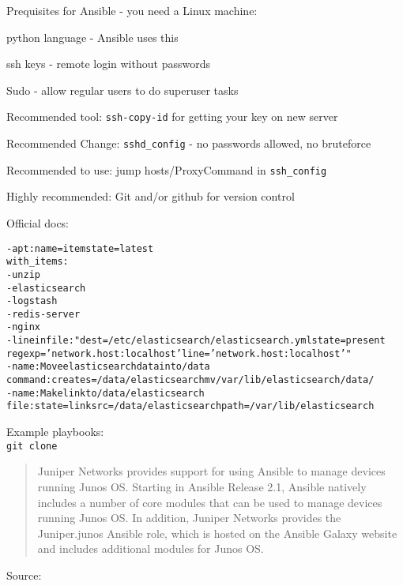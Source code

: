 \documentclass[Screen16to9,17pt]{foils}
\begin{document}
Prequisites for Ansible - you need a Linux machine:
\begin{list2}
\item python language - Ansible uses this
\item ssh keys - remote login without passwords
\item Sudo - allow regular users to do superuser tasks
\item Recommended tool: \verb+ssh-copy-id+ for getting your key on new server
\item Recommended Change: \verb+sshd_config+ - no passwords allowed, no bruteforce
\item Recommended to use: jump hosts/ProxyCommand in \verb+ssh_config+
\item Highly recommended: Git and/or github for version control
\end{list2}

Official docs:\\




\begin{alltt}\small
- apt: name={{ item }} state=latest
  with_items:
        - unzip
        - elasticsearch
        - logstash
        - redis-server
        - nginx
- lineinfile: "dest=/etc/elasticsearch/elasticsearch.yml state=present
  regexp='network.host: localhost' line='network.host: localhost'"
- name: Move elasticsearch data into /data
  command: creates=/data/elasticsearch mv /var/lib/elasticsearch /data/
- name: Make link to /data/elasticsearch
  file: state=link src=/data/elasticsearch path=/var/lib/elasticsearch
\end{alltt}

Example playbooks:\\
\verb+git clone +




\begin{quote}
  Juniper Networks provides support for using Ansible to manage devices running Junos OS. Starting in Ansible Release 2.1, Ansible natively includes a number of core modules that can be used to manage devices running Junos OS. In addition, Juniper Networks provides the Juniper.junos Ansible role, which is hosted on the Ansible Galaxy website and includes additional modules for Junos OS.
\end{quote}
Source:{\footnotesize
{}}
\end{document}
